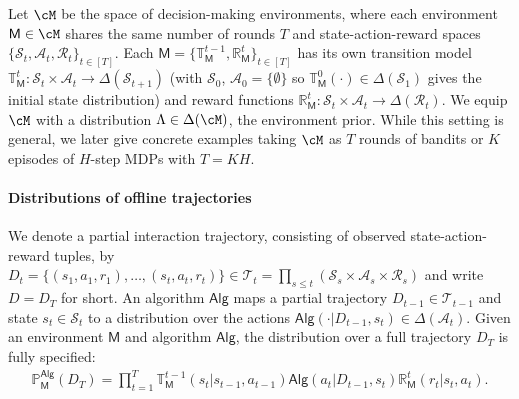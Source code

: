 \documentclass[10pt]{article}
\newcommand{\<}{\left\langle}
\renewcommand{\>}{\right\rangle}
\renewcommand{\P}{\mathbb{P}}
\newcommand{\inst}{{\mathsf{M}}}
\newcommand{\trajsp}{{\mathcal{T}}}
\newcommand{\transmodel}{{\mathbb T}}
\newcommand{\rewmodel}{{\mathbb R}}
\newcommand{\state}{{s}}
\newcommand{\action}{{a}}
\newcommand{\reward}{{r}}
\newcommand{\totlen}{{T}}
\newcommand{\sAlg}{{\mathsf{Alg}}}
\newcommand{\dset}{{D}}
\newcommand{\prior}{{\Lambda}}
\newcommand{\statesp}{{\mathcal{S}}}
\newcommand{\actionsp}{{\mathcal{A}}}
\newcommand{\rewardsp}{{\mathcal{R}}}
\begin{document}
Let $\cM$ be the space of decision-making environments, where each environment $\inst \in \cM$ shares the same number of rounds $\totlen$ and state-action-reward spaces $\{ \statesp_t,  \actionsp_t, \rewardsp_t \}_{t \in [\totlen]}$. Each $\inst = \{\transmodel_\inst^{t-1}, \rewmodel_\inst^t \}_{t \in [\totlen]}$ has its own transition model $\transmodel_\inst^t: \statesp_{t} \times \actionsp_{t} \to \Delta(\statesp_{t+1})$ (with $\statesp_0$, $\actionsp_0 = \{ \emptyset \}$ so $\transmodel_\inst^0(\cdot) \in \Delta(\statesp_1)$ gives the initial state distribution) and reward functions $\rewmodel_\inst^{t}: \statesp_{t} \times \actionsp_{t} \to \Delta(\rewardsp_t)$. We equip $\cM$ with a distribution $\prior \in \Delta(\cM)$, the environment prior. While this setting is general, we later give concrete examples taking $\cM$ as $\totlen$ rounds of bandits or $K$ episodes of $H$-step MDPs with $\totlen = K H$. 

\paragraph{Distributions of offline trajectories} We denote a partial interaction trajectory, consisting of observed state-action-reward tuples, by $\dset_t=\{(\state_1,\action_1,\reward_1),\ldots,(\state_t,\action_t,\reward_t)\} \in \trajsp_t = \prod_{s \le t} (\statesp_s \times \actionsp_s \times \rewardsp_s)$ and write $\dset = \dset_{\totlen}$ for short. An algorithm $\sAlg$ maps a partial trajectory $\dset_{t-1} \in \trajsp_{t-1}$ and state $\state_t \in \statesp_t$ to a distribution over the actions $\sAlg(\cdot | \dset_{t-1}, \state_t) \in \Delta(\actionsp_t)$. Given an environment $\inst$ and algorithm $\sAlg$, the distribution over a full trajectory $\dset_\totlen$ is fully specified: 
\begin{align*}
\textstyle \P_{\inst}^{\sAlg}(\dset_\totlen) =
\prod_{t=1}^{\totlen}\transmodel_{\inst}^{t-1}(\state_{t}|\state_{t-1},\action_{t-1}) \sAlg(\action_t|\dset_{t-1},\state_t)\rewmodel_{\inst}^t(\reward_t|\state_t,\action_t).
\end{align*}
\end{document}
